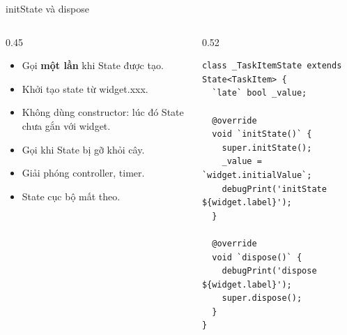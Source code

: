 \documentclass[aspectratio=169,11pt]{beamer}
\newcommand{\ma}[1]{{\ttfamily\small #1}}
\begin{document}
\begin{frame}[fragile]{initState và dispose}
  \begin{columns}[T,onlytextwidth]
    \begin{column}{0.45\textwidth}
      \textbf{\color{chinh}\ma{initState}}
      \begin{itemize}
        \item Gọi \textbf{một lần} khi State được tạo.
        \item Khởi tạo state từ \ma{widget.xxx}.
        \item Không dùng constructor: lúc đó State chưa gắn với widget.
      \end{itemize}
      \vspace{1.5mm}
      \textbf{\color{chinh}\ma{dispose}}
      \begin{itemize}
        \item Gọi khi State bị gỡ khỏi cây.
        \item Giải phóng controller, timer.
        \item State cục bộ mất theo.
      \end{itemize}
    \end{column}
    \begin{column}{0.52\textwidth}
\begin{lstlisting}
class _TaskItemState extends State<TaskItem> {
  `late` bool _value;

  @override
  void `initState()` {
    super.initState();
    _value = `widget.initialValue`;
    debugPrint('initState ${widget.label}');
  }

  @override
  void `dispose()` {
    debugPrint('dispose ${widget.label}');
    super.dispose();
  }
}
\end{lstlisting}
    \end{column}
  \end{columns}
\end{frame}
\end{document}

